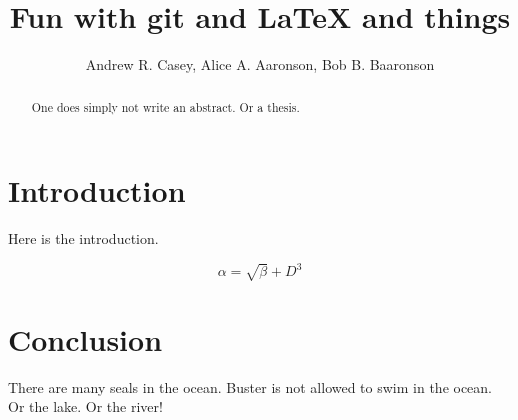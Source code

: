 \documentclass{article}
\begin{document}
\title{Fun with git and \LaTeX{} and things}
\author{Andrew R. Casey, Alice A. Aaronson, Bob B. Baaronson}

\maketitle

\begin{abstract}
One does simply not write an abstract. Or a thesis.
\end{abstract}

\section{Introduction}
Here is the introduction.

\begin{equation}
    \label{simple_equation}
    \alpha = \sqrt{ \beta } + D^3
\end{equation}


\section{Conclusion}
There are many seals in the ocean. Buster is not allowed to swim in the ocean. Or the lake. Or the river!
\end{document}
